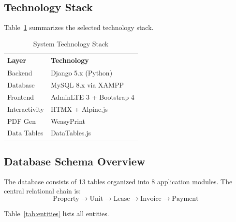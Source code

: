 \documentclass[conference]{IEEEtran}
\begin{document}
\subsection{Technology Stack}

Table~\ref{tab:techstack} summarizes the selected technology stack.

\begin{table}[h]
\centering
\caption{System Technology Stack}
\label{tab:techstack}
\begin{tabular}{|p{2.2cm}|p{5.2cm}|}
\hline
\textbf{Layer} & \textbf{Technology} \\
\hline
Backend & Django 5.x (Python) \\
\hline
Database & MySQL 8.x via XAMPP \\
\hline
Frontend & AdminLTE 3 + Bootstrap 4 \\
\hline
Interactivity & HTMX + Alpine.js \\
\hline
PDF Gen & WeasyPrint \\
\hline
Data Tables & DataTables.js \\
\hline
\end{tabular}
\end{table}

\subsection{Database Schema Overview}

The database consists of 13 tables organized into 8 application modules. The central relational chain is:
\[ \text{Property} \to \text{Unit} \to \text{Lease} \to \text{Invoice} \to \text{Payment} \]

Table~\ref{tab:entities} lists all entities.
\end{document}
